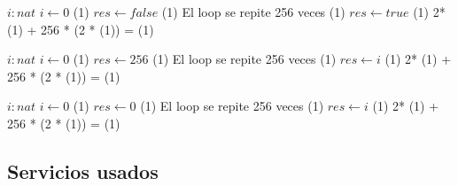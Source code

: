   {
    \var $i : nat$
    \State $i \gets 0$                                                  \comment \bigo(1)
    \State $res \gets false$                                            \comment \bigo(1)
         \Statex             \comment El loop se repite 256 veces
                                               \comment \bigo(1)
             \State $res \gets true$                                    \comment \bigo(1)
          \EndIf
    \EndWhile
}{  2* \bigo(1) + 256 * (2 * \bigo(1))  = \bigo(1) }

  {
    \var $i : nat$
    \State $i \gets 0$                                                  \comment \bigo(1)
    \State $res \gets 256$                                              \comment \bigo(1)
         \Statex             \comment El loop se repite 256 veces
                                 \comment \bigo(1)
             \State $res \gets i$                                       \comment \bigo(1)
          \EndIf
    \EndWhile
}{  2* \bigo(1) + 256 * (2 * \bigo(1))  = \bigo(1) }

  {
    \var $i : nat$
    \State $i \gets 0$                                                  \comment \bigo(1)
    \State $res \gets 0$                                                \comment \bigo(1)
         \Statex             \comment El loop se repite 256 veces
                                 \comment \bigo(1)
             \State $res \gets i$                                       \comment \bigo(1)
          \EndIf
    \EndWhile
}{  2* \bigo(1) + 256 * (2 * \bigo(1))  = \bigo(1) }


\subsection{Servicios usados}


